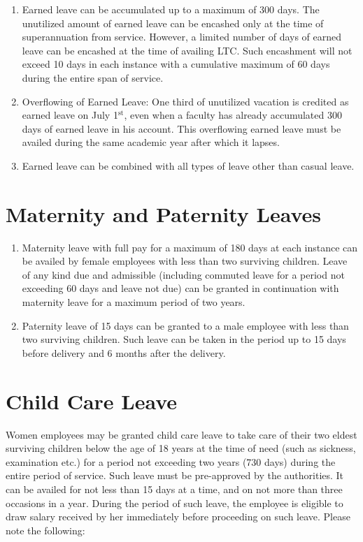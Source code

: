 \documentclass[
  10pt,
  a5paper,
  10pt,
  openany]{amsbook}
\providecommand{\tightlist}{%
  \setlength{\itemsep}{0pt}\setlength{\parskip}{0pt}}
\begin{document}
\begin{enumerate}
\def\labelenumi{\arabic{enumi}.}
\tightlist
\item
  Earned leave can be accumulated up to a maximum of 300 days. The
  unutilized amount of earned leave can be encashed only at the time of
  superannuation from service. However, a limited number of days of
  earned leave can be encashed at the time of availing LTC. Such
  encashment will not exceed 10 days in each instance with a cumulative
  maximum of 60 days during the entire span of service.
\item
  Overflowing of Earned Leave: One third of unutilized vacation is
  credited as earned leave on July 1\(^{\text{st}}\), even when a
  faculty has already accumulated 300 days of earned leave in his
  account. This overflowing earned leave must be availed during the same
  academic year after which it lapses.
\item
  Earned leave can be combined with all types of leave other than casual
  leave.
\end{enumerate}

\section{Maternity and Paternity
Leaves}\label{maternity-and-paternity-leaves}

\begin{enumerate}
\def\labelenumi{\arabic{enumi}.}
\tightlist
\item
  Maternity leave with full pay for a maximum of 180 days at each
  instance can be availed by female employees with less than two
  surviving children. Leave of any kind due and admissible (including
  commuted leave for a period not exceeding 60 days and leave not due)
  can be granted in continuation with maternity leave for a maximum
  period of two years.
\item
  Paternity leave of 15 days can be granted to a male employee with less
  than two surviving children. Such leave can be taken in the period up
  to 15 days before delivery and 6 months after the delivery.
\end{enumerate}

\section{Child Care Leave}\label{child-care-leave}

Women employees may be granted child care leave to take care of their
two eldest surviving children below the age of 18 years at the time of
need (such as sickness, examination etc.) for a period not exceeding two
years (730 days) during the entire period of service. Such leave must be
pre-approved by the authorities. It can be availed for not less than 15
days at a time, and on not more than three occasions in a year. During
the period of such leave, the employee is eligible to draw salary
received by her immediately before proceeding on such leave. Please note
the following:
\end{document}
